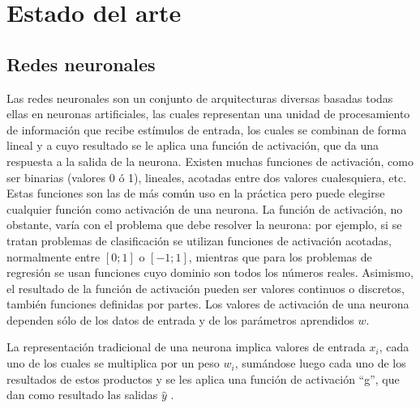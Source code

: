 \documentclass[12pt, spanish]{article}
\begin{document}
\clearpage

\section{Estado del arte}
\label{sec:estado_del_arte}

\subsection{Redes neuronales} %
Las redes neuronales son un conjunto de arquitecturas diversas basadas todas ellas
en neuronas artificiales, las cuales representan una unidad de procesamiento de
información que recibe estímulos de entrada, los cuales se combinan de forma
lineal y a cuyo resultado se le aplica una función de activación, que da una respuesta
a la salida de la neurona. Existen muchas funciones de activación, como ser binarias
(valores 0 ó 1), lineales, acotadas entre dos valores cualesquiera, etc. Estas funciones
son las de más común uso en la práctica pero puede elegirse cualquier función
como activación de una neurona. La función de activación, no obstante, varía con el problema
que debe resolver la neurona: por ejemplo, si se tratan problemas de clasificación
se utilizan funciones de activación acotadas, normalmente entre $[0;1]$ o $[-1;1]$,
mientras que para los problemas de regresión se usan funciones cuyo dominio son
todos los números reales.
Asimismo, el resultado de la función de activación pueden ser valores continuos
o discretos, también funciones definidas por partes.
Los valores de activación de una neurona dependen sólo de los datos de entrada
y de los parámetros aprendidos $w$.

La representación tradicional de una neurona implica valores de entrada $x_i$,
cada uno de los cuales se multiplica por un peso $w_i$, sumándose luego cada uno de
los resultados de estos productos y se les aplica una función de activación ``g'',
que dan como resultado las salidas $\hat{y}$ \cite{isasi2004redes}.
\end{document}
